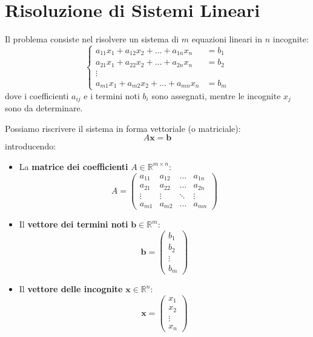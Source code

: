 \section{Risoluzione di Sistemi Lineari}

Il problema consiste nel risolvere un sistema di $m$ equazioni lineari in $n$ incognite:
\[
\begin{cases}
    a_{11}x_1 + a_{12}x_2 + \dots + a_{1n}x_n &= b_1 \\
    a_{21}x_1 + a_{22}x_2 + \dots + a_{2n}x_n &= b_2 \\
    \vdots \\
    a_{m1}x_1 + a_{m2}x_2 + \dots + a_{mn}x_n &= b_m
\end{cases}
\]
dove i coefficienti $a_{ij}$ e i termini noti $b_i$ sono assegnati, mentre le incognite $x_j$ sono da determinare.

Possiamo riscrivere il sistema in forma vettoriale (o matriciale):
\begin{equation} \label{eq:sistema_lineare}
    A\mathbf{x} = \mathbf{b}
\end{equation}
introducendo:
\begin{itemize}
    \item La \textbf{matrice dei coefficienti} $A \in \mathbb{R}^{m \times n}$:
    \[ A = 
    \begin{pmatrix}
        a_{11} & a_{12} & \dots & a_{1n} \\
        a_{21} & a_{22} & \dots & a_{2n} \\
        \vdots & \vdots & \ddots & \vdots \\
        a_{m1} & a_{m2} & \dots & a_{mn}
    \end{pmatrix}
    \]
    \item Il \textbf{vettore dei termini noti} $\mathbf{b} \in \mathbb{R}^m$:
    \[ \mathbf{b} = \begin{pmatrix} b_1 \\ b_2 \\ \vdots \\ b_m \end{pmatrix} \]
    \item Il \textbf{vettore delle incognite} $\mathbf{x} \in \mathbb{R}^n$:
    \[ \mathbf{x} = \begin{pmatrix} x_1 \\ x_2 \\ \vdots \\ x_n \end{pmatrix} \]
\end{itemize}

